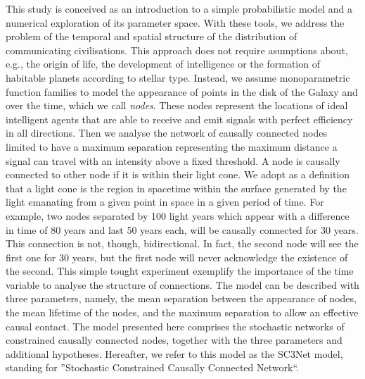 \documentclass[crop]{CSLB}
\begin{document}

This study is conceived as an introduction to a simple probabilistic
model and a numerical exploration of its parameter space.
%
With these tools, we address the problem of the temporal and spatial structure of
the distribution of communicating civilisations.
%
This approach does not require asumptions about, e.g., the origin of life, the development of
intelligence or the formation of habitable planets according to stellar type.
%
Instead, we assume monoparametric function families to model the appearance of
points in the disk of the Galaxy and over the time, which we call
\textit{nodes}.
%
These nodes represent the locations of ideal intelligent agents that are able
to receive and emit signals with perfect efficiency in all directions.
%
Then we analyse the network of causally connected nodes limited to have a
maximum separation representing the maximum distance a signal can travel with
an intensity above a fixed threshold.
%
A node is causally connected to other node if it is within their light cone.
%
We adopt as a definition that a light cone is the region in spacetime within
the surface generated by the light emanating from a given point in space in a
given period of time.
%
For example, two nodes separated by 100 light years which appear with a
difference in time of 80 years and last 50 years each, will be causally
connected for 30 years.
%
This connection is not, though, bidirectional.
%
In fact, the second node will see the first one for 30 years, but the first
node will never acknowledge the existence of the second.
%
This simple tought experiment exemplify the importance of the time variable to
analyse the structure of connections.
%
The model can be described with three parameters, namely, the mean separation
between the appearance of nodes, the mean lifetime of the nodes, and the
maximum separation to allow an effective causal contact.
%
The model presented here comprises the stochastic networks of constrained
causally connected nodes, together with the three parameters and additional
hypotheses.
%
Hereafter, we refer to this model as the SC3Net model, standing for
''Stochastic Constrained Causally Connected Network``.
\end{document}
